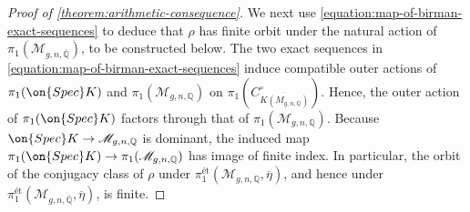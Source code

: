 \documentclass[12 pt]{amsart}
\theoremstyle{plain}
\theoremstyle{definition}
\theoremstyle{remark}
\numberwithin{equation}{section}
\begin{document}
\begin{proof}[Proof of \autoref{theorem:arithmetic-consequence}]
We next use \eqref{equation:map-of-birman-exact-sequences} to deduce that 
$\rho$ has finite orbit under the natural action of $\pi_1(\mathscr
M_{g,n,\mathbb \overline{\mathbb Q}})$, to be constructed below.
	The two exact sequences in
	\eqref{equation:map-of-birman-exact-sequences} induce compatible outer actions of
	$\pi_1(\on{Spec} K)$ and $\pi_1(\mathscr
	M_{g,n,\mathbb Q})$ on 
	$\pi_1(C^\circ_{\overline {K(M_{g,n,\mathbb Q})}})$.
	Hence, the outer action of
	$\pi_1(\on{Spec} K)$ factors through that of $\pi_1(\mathscr
	M_{g,n,\mathbb Q})$.
	Because $\on{Spec} K \to \mathscr
	M_{g,n,\mathbb Q}$ is dominant, the induced map
$\pi_1(\on{Spec} K) \to \pi_1(\mathscr M_{g,n,\mathbb Q})$ has image of finite
index.
In particular, the orbit of the conjugacy class of $\rho$ under
$\pi_1^{\text{\'et}}(\mathscr{M}_{g,n, \mathbb{Q}}, \overline{\eta})$,
and hence under $\pi_1^{\text{\'et}}(\mathscr{M}_{g,n,
\overline{\mathbb{Q}}}, \overline{\eta})$, is finite. 


\end{proof}
\end{document}
